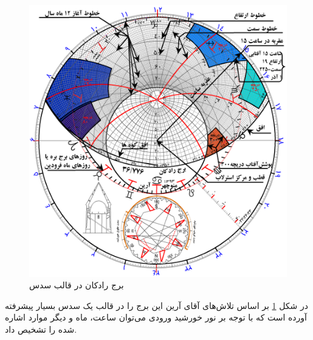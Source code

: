 \documentclass{article}
\begin{document}
	\begin{figure}[h!]
			\includegraphics[width=\linewidth]{figures/r5.png}
			\caption{برج رادکان در قالب سدس}
			\label{radkandosos}
		\end{figure}
		\clearpage
		
	در شکل \ref{radkandosos} بر اساس تلاش‌های آقای آرین این برج را در قالب یک سدس بسیار پیشرفته آورده است که با توجه بر نور خورشید ورودی می‌توان ساعت، ماه  و دیگر موارد اشاره شده را تشخیص داد.   
\end{document}
